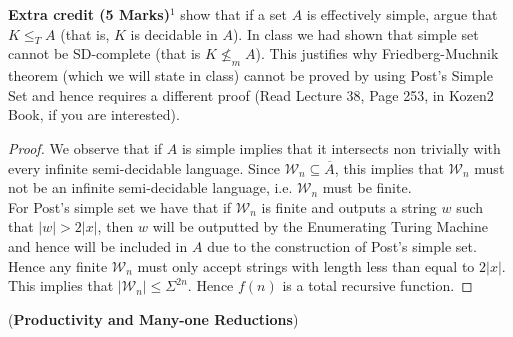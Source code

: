 \documentclass[solution,addpoints,12pt]{exam}
\renewcommand{\W}{\ensuremath{\mathcal{W}}\xspace}
\begin{document}
\begin{questions}
\textbf{Extra credit (5 Marks)}$^1$ show that if a set $A$ is effectively simple, argue that $K \le_T A$ (that is, $K$ is decidable in $A$).
In class we had shown that simple set cannot be SD-complete (that is $K \not\le_m A$). This justifies why Friedberg-Muchnik theorem (which we will state in class) cannot be proved by using Post's Simple Set and hence requires a different proof (Read Lecture 38, Page 253, in Kozen2 Book, if you are interested).
\begin{solution}
	\begin{proof}
		We observe that if $A$ is simple implies that it intersects non trivially with every infinite semi-decidable language. Since $\W_n \subseteq \overline A$, this implies that $\W_n$ must not be an infinite semi-decidable language, i.e. $\W_n$ must be finite.
		\\
		For Post's simple set we have that if $\W_n$ is finite and outputs a string $w$ such that $|w| > 2|x|$, then $w$ will be outputted by the Enumerating Turing Machine and hence will be included in $A$ due to the construction of Post's simple set. Hence any finite $\W_n$ must only accept strings with length less than equal to $2|x|$. This implies that $|\W_n| \leq \Sigma^{2n}$. Hence $f(n)$ is a total recursive function.
	\end{proof}
\end{solution}

\question[7] (\textbf{Productivity and Many-one Reductions})
\begin{solution}
	\begin{parts}

\end{parts}
\end{solution}
\end{questions}
\end{document}
